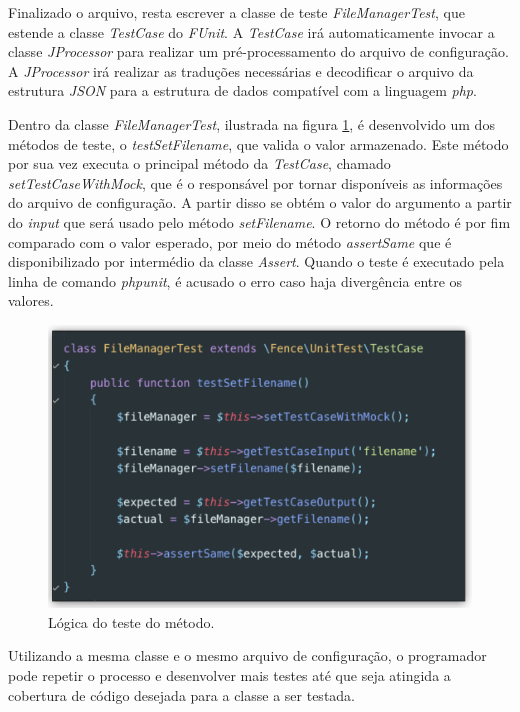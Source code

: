 Finalizado o arquivo, resta escrever a classe de teste \emph{FileManagerTest}, que estende a classe \emph{TestCase} do \emph{FUnit}. A \emph{TestCase} irá automaticamente invocar a classe \emph{JProcessor} para realizar um pré-processamento do arquivo de configuração. A \emph{JProcessor} irá realizar as traduções necessárias e decodificar o arquivo da estrutura \emph{JSON} para a estrutura de dados compatível com a linguagem \emph{php}.

Dentro da classe \emph{FileManagerTest}, ilustrada na figura \ref{fig:logica-do-teste}, é desenvolvido um dos métodos de teste, o \emph{testSetFilename}, que valida o valor armazenado. Este método por sua vez executa o principal método da \emph{TestCase}, chamado \emph{setTestCaseWithMock}, que é o responsável por tornar disponíveis as informações do arquivo de configuração. A partir disso se obtém o valor do argumento a partir do \emph{input} que será usado pelo método \emph{setFilename}. O retorno do método é por fim comparado com o valor esperado, por meio do método \emph{assertSame} que é disponibilizado por intermédio da classe \emph{Assert}. Quando o teste é executado pela linha de comando \emph{phpunit}, é acusado o erro caso haja divergência entre os valores.

\begin{figure}[H]
    \centering
    \includegraphics[width=13cm]{source/4-solucao/images/logica-do-teste.png}
    \caption{Lógica do teste do método.}
    \label{fig:logica-do-teste}
\end{figure}

Utilizando a mesma classe e o mesmo arquivo de configuração, o programador pode repetir o processo e desenvolver mais testes até que seja atingida a cobertura de código desejada para a classe a ser testada.

